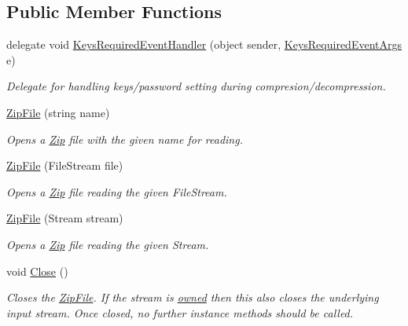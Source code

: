 \subsection*{Public Member Functions}
\begin{DoxyCompactItemize}
\item 
delegate void \hyperlink{class_i_c_sharp_code_1_1_sharp_zip_lib_1_1_zip_1_1_zip_file_ab2c704e700f9b0c079f12a4c5ea775f4}{Keys\+Required\+Event\+Handler} (object sender, \hyperlink{class_i_c_sharp_code_1_1_sharp_zip_lib_1_1_zip_1_1_keys_required_event_args}{Keys\+Required\+Event\+Args} e)
\begin{DoxyCompactList}\small\item\em Delegate for handling keys/password setting during compresion/decompression. \end{DoxyCompactList}\item 
\hyperlink{class_i_c_sharp_code_1_1_sharp_zip_lib_1_1_zip_1_1_zip_file_aa418da27fd51ba771192002ae94f1595}{Zip\+File} (string name)
\begin{DoxyCompactList}\small\item\em Opens a \hyperlink{namespace_i_c_sharp_code_1_1_sharp_zip_lib_1_1_zip}{Zip} file with the given name for reading. \end{DoxyCompactList}\item 
\hyperlink{class_i_c_sharp_code_1_1_sharp_zip_lib_1_1_zip_1_1_zip_file_a210dba0f633ebede45066aa3f50d79d1}{Zip\+File} (File\+Stream file)
\begin{DoxyCompactList}\small\item\em Opens a \hyperlink{namespace_i_c_sharp_code_1_1_sharp_zip_lib_1_1_zip}{Zip} file reading the given File\+Stream. \end{DoxyCompactList}\item 
\hyperlink{class_i_c_sharp_code_1_1_sharp_zip_lib_1_1_zip_1_1_zip_file_aa43c0923b0664d82f6b9cdec2b9efa3d}{Zip\+File} (Stream stream)
\begin{DoxyCompactList}\small\item\em Opens a \hyperlink{namespace_i_c_sharp_code_1_1_sharp_zip_lib_1_1_zip}{Zip} file reading the given Stream. \end{DoxyCompactList}\item 
void \hyperlink{class_i_c_sharp_code_1_1_sharp_zip_lib_1_1_zip_1_1_zip_file_aeb7e59b277d058f45aa417cb07b4b1d3}{Close} ()
\begin{DoxyCompactList}\small\item\em Closes the \hyperlink{class_i_c_sharp_code_1_1_sharp_zip_lib_1_1_zip_1_1_zip_file}{Zip\+File}. If the stream is \hyperlink{class_i_c_sharp_code_1_1_sharp_zip_lib_1_1_zip_1_1_zip_file_a12922b0e2e600c62cfe743aba809ff7c}{owned} then this also closes the underlying input stream. Once closed, no further instance methods should be called. \end{DoxyCompactList}\item 

\end{DoxyCompactItemize}
